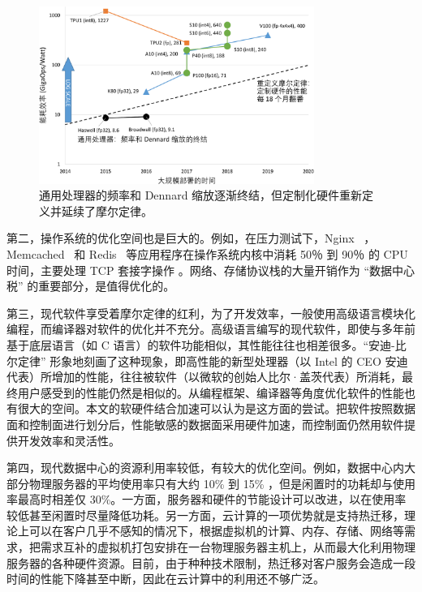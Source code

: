 \begin{figure}[htbp]
	\centering
	\includegraphics[width=0.8\textwidth]{figures/moores_law_redefined.pdf}
	\caption{通用处理器的频率和 Dennard 缩放逐渐终结，但定制化硬件重新定义并延续了摩尔定律。}
	\label{background:fig:moores_law_redefined}
\end{figure}

第二，操作系统的优化空间也是巨大的。例如，在压力测试下，Nginx~ \cite {reese2008nginx}，Memcached~ \cite {fitzpatrick2004distributed} 和 Redis~ \cite {carlson2013redis}等应用程序在操作系统内核中消耗 50％ 到 90％ 的 CPU 时间，主要处理 TCP 套接字操作 \cite{jeong2014mtcp}。网络、存储协议栈的大量开销作为 ``数据中心税'' 的重要部分，是值得优化的。

第三，现代软件享受着摩尔定律的红利，为了开发效率，一般使用高级语言模块化编程，而编译器对软件的优化并不充分。高级语言编写的现代软件，即使与多年前基于底层语言（如 C 语言）的软件功能相似，其性能往往也相差很多。``安迪-比尔定律'' 形象地刻画了这种现象，即高性能的新型处理器（以 Intel 的 CEO 安迪代表）所增加的性能，往往被软件（以微软的创始人比尔·盖茨代表）所消耗，最终用户感受到的性能仍然是相似的。从编程框架、编译器等角度优化软件的性能也有很大的空间。本文的软硬件结合加速可以认为是这方面的尝试。把软件按照数据面和控制面进行划分后，性能敏感的数据面采用硬件加速，而控制面仍然用软件提供开发效率和灵活性。

第四，现代数据中心的资源利用率较低，有较大的优化空间。例如，数据中心内大部分物理服务器的平均使用率只有大约 10\% 到 15\% \cite{barroso2018datacenter}，但是闲置时的功耗却与使用率最高时相差仅 30\%。一方面，服务器和硬件的节能设计可以改进，以在使用率较低甚至闲置时尽量降低功耗。另一方面，云计算的一项优势就是支持热迁移，理论上可以在客户几乎不感知的情况下，根据虚拟机的计算、内存、存储、网络等需求，把需求互补的虚拟机打包安排在一台物理服务器主机上，从而最大化利用物理服务器的各种硬件资源。目前，由于种种技术限制，热迁移对客户服务会造成一段时间的性能下降甚至中断，因此在云计算中的利用还不够广泛。


